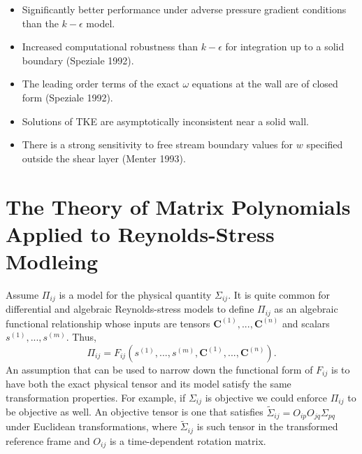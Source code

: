 \documentclass[oneside,a4paper,11pt]{report}
\begin{document}
\begin{itemize}
\item Significantly better performance under adverse pressure gradient conditions than the $k-\epsilon$ model.
\item Increased computational robustness than $k-\epsilon$ for integration up to a solid boundary (Speziale 1992).
\item The leading order terms of the exact $\omega$ equations at the wall are of closed form (Speziale 1992). 
\item  Solutions of TKE are asymptotically inconsistent near a solid wall.
\item There is a strong sensitivity to free stream boundary values for $w$ specified outside the shear layer (Menter 1993).
\end{itemize}

\section{The Theory of Matrix Polynomials Applied to Reynolds-Stress Modleing}

\label{sec:polynomial_expansions}
Assume $\Pi_{ij}$ is a model for the physical quantity $\Sigma_{ij}$. It is quite common for differential and algebraic Reynolds-stress models to define $\Pi_{ij}$ as an algebraic functional relationship whose inputs are tensors $\mathbf{C}^{(1)},...,\mathbf{C}^{(n)}$ and scalars $s^{(1)},...,s^{(m)}$. Thus,
\begin{equation}
\Pi_{ij} = F_{ij}(s^{(1)}, ..., s^{(m)},\mathbf{C}^{(1)}, ..., \mathbf{C}^{(n)}).
\end{equation}
An assumption that can be used to narrow down the functional form of $F_{ij}$ is to have both the exact physical tensor and its model satisfy the same transformation properties. For example, if $\Sigma_{ij}$ is objective we could enforce $\Pi_{ij}$ to be objective as well. An objective tensor is one that satisfies $\tilde{\Sigma}_{ij} = O_{ip}O_{jq}\Sigma_{pq}$ under Euclidean transformations, where $\tilde{\Sigma}_{ij}$ is such tensor in the transformed reference frame and $O_{ij}$ is a time-dependent rotation matrix.
\end{document}
